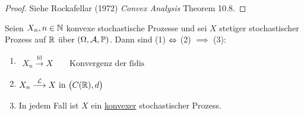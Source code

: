 
\begin{proof}
	Siehe Rockafellar (1972) \textit{Convex Analysis} Theorem 10.8.
\end{proof}

\begin{satz}\label{satz9.9}
	Seien $X_n,n\in\mathbb{N}$ konvexe stochastische Prozesse und sei $X$ stetiger stochastischer Prozess auf $\mathbb{R}$ über $(\Omega,\mathcal{A},\mathbb{P})$.
	Dann sind (1) $\Leftrightarrow$ (2) $\implies$ (3):
	\begin{enumerate}[label=(\arabic*)]
		\item $\begin{aligned}
			X_n\overset{\text{fd}}{\longrightarrow}X\qquad\text{Konvergenz der fidis}
		\end{aligned}$
		\item $\begin{aligned}
			X_n\overset{\mathcal{L}}{\longrightarrow} X\text{ in }\big(C(\mathbb{R}),d\big)
		\end{aligned}$
		\item In jedem Fall ist $X$ ein \underline{konvexer} stochastischer Prozess.
	\end{enumerate}
\end{satz}

